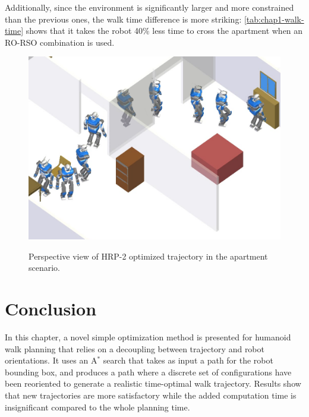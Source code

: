 Additionally, since the environment is significantly larger and more
constrained than the previous ones, the walk time difference is more
striking: \autoref{tab:chap1-walk-time} shows that it takes the robot
40\% less time to cross the apartment when an RO-RSO combination is
used.

\begin{figure}
  \centering
      {\includegraphics[width = 0.8\linewidth]
        {src/chap1-path-optimization/apartment-hash-optim-perspective-hrp2.png}}
      \caption{Perspective view of HRP-2 optimized trajectory in the
        apartment scenario.}
      \label{fig:chap1-apartment-hash-optim-perspective-hrp2}
\end{figure}

\section{Conclusion}
In this chapter, a novel simple optimization method is
presented for humanoid walk planning that relies on a decoupling
between trajectory and robot orientations. It uses an A$^{*}$ search that
takes as input a path for the robot bounding box, and produces a path
where a discrete set of configurations have been reoriented to generate
a realistic time-optimal walk trajectory. Results show that new
trajectories are more satisfactory while the added computation time is
insignificant compared to the whole planning time.

